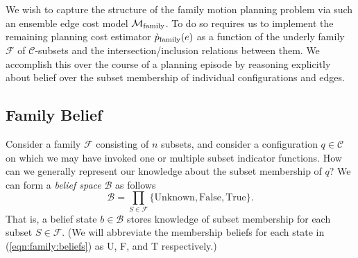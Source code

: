 We wish to capture the structure of the family motion planning problem
via such an ensemble edge cost model $\mathcal{M}_{\mbox{\scriptsize family}}$.
To do so requires us to implement the remaining planning cost estimator
$\grave{p}_{\mbox{\scriptsize family}}(e)$
as a function of the underly family
$\mathcal{F}$ of $\mathcal{C}$-subsets
and the intersection/inclusion relations between them.
We accomplish this over the course of a planning episode
by reasoning explicitly about belief over the subset membership
of individual configurations and edges.


\subsection{Family Belief}

Consider a family $\mathcal{F}$ consisting of $n$ subsets,
and consider a configuration $q \in \mathcal{C}$ on which
we may have invoked one or multiple subset indicator functions.
How can we generally represent our knowledge
about the subset membership of $q$?
We can form a \emph{belief space} $\mathcal{B}$ as follows
\begin{equation}
   \mathcal{B} = \prod_{S \in \mathcal{F}}
      \{ \mbox{Unknown}, \mbox{False}, \mbox{True} \}.
   \label{eqn:family:beliefs}
\end{equation}
That is,
a belief state $b \in \mathcal{B}$ stores
knowledge of subset membership for each subset $S \in \mathcal{F}$.
(We will abbreviate the membership beliefs for each state
in (\ref{eqn:family:beliefs})
as U, F, and T respectively.)

